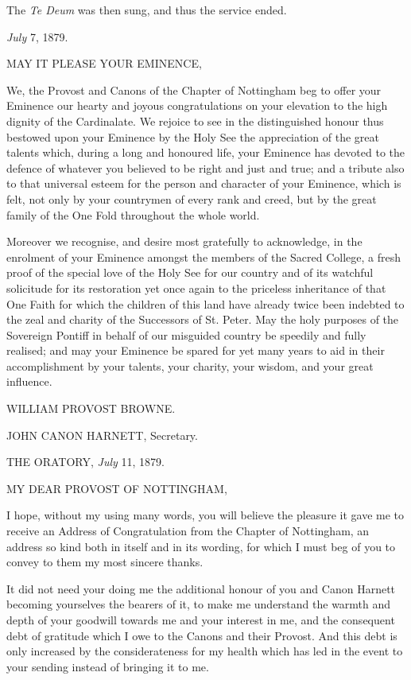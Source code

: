 The \emph{Te Deum} was then sung, and thus the service ended.


\emph{July} 7, 1879.

MAY IT PLEASE
YOUR EMINENCE,

We, the Provost and Canons of the Chapter of Nottingham beg to offer
your Eminence our hearty and joyous congratulations on your elevation
to the high dignity of the Cardinalate. We rejoice to see in the
distinguished honour thus bestowed upon your Eminence by the Holy See
the appreciation of the great talents which, during a long and
honoured life, your Eminence has devoted to the defence of whatever
you believed to be right and just and true; and a tribute also to that
universal esteem for the person and character of your Eminence, which
is felt, not only by your countrymen of every rank and creed, but by
the great family of the One Fold throughout the whole world.

Moreover we recognise, and desire most gratefully to acknowledge,
in the enrolment of your Eminence amongst the members of the Sacred
College, a fresh proof of the special love of the Holy See for our
country and of its watchful solicitude for its restoration yet once
again to the priceless inheritance of that One Faith for which
the children of this land have already twice been indebted to the zeal
and charity of the Successors of St. Peter. May the holy purposes of
the Sovereign Pontiff in behalf of our misguided country be speedily
and fully realised; and may your Eminence be spared for yet many years
to aid in their accomplishment by your talents, your charity, your
wisdom, and your great influence.

WILLIAM PROVOST BROWNE.

JOHN CANON HARNETT,
Secretary.


THE ORATORY, \emph{July}
11, 1879.

MY DEAR PROVOST
OF NOTTINGHAM,

I hope, without my using many words, you will believe the pleasure it
gave me to receive an Address of Congratulation from the Chapter of
Nottingham, an address so kind both in itself and in its wording, for
which I must beg of you to convey to them my most sincere thanks.

It did not need your doing me the additional honour of you and
Canon Harnett becoming yourselves the bearers of it, to make me
understand the warmth and depth of your goodwill towards me and your
interest in me, and the consequent debt of gratitude which I owe to
the Canons and their Provost. And this debt is only increased by
the considerateness for my health which has led in the event to your
sending instead of bringing it to me.


